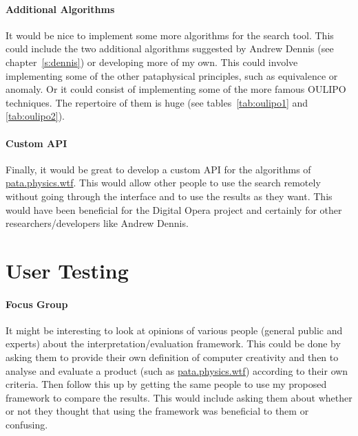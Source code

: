 \paragraph{Additional Algorithms} 
It would be nice to implement some more algorithms for the search tool. This could include the two additional algorithms suggested by Andrew Dennis (see chapter~\ref{s:dennis}) or developing more of my own. This could involve implementing some of the other pataphysical principles, such as equivalence or anomaly. Or it could consist of implementing some of the more famous \ac{OULIPO} techniques. The repertoire of them is huge (see tables~\ref{tab:oulipo1} and \ref{tab:oulipo2}).

\paragraph{Custom API}
Finally, it would be great to develop a custom \ac{API} for the algorithms of \url{pata.physics.wtf}. This would allow other people to use the search remotely without going through the interface and to use the results as they want. This would have been beneficial for the Digital Opera project and certainly for other researchers/developers like Andrew Dennis.


\section{User Testing}

\paragraph{Focus Group}
It might be interesting to look at opinions of various people (general public and experts) about the interpretation/evaluation framework. This could be done by asking them to provide their own definition of computer creativity and then to analyse and evaluate a product (such as \url{pata.physics.wtf}) according to their own criteria. Then follow this up by getting the same people to use my proposed framework to compare the results. This would include asking them about whether or not they thought that using the framework was beneficial to them or confusing.

